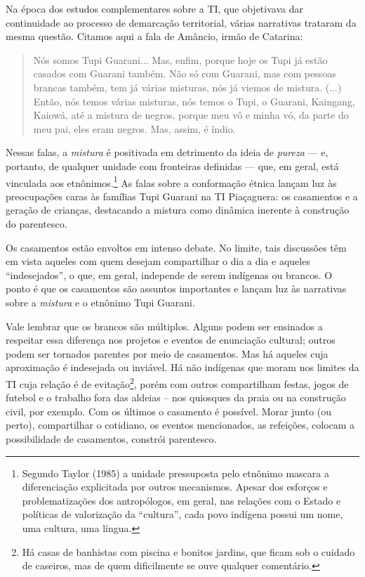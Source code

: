 Na época dos estudos complementares sobre a TI, que objetivava dar
continuidade ao processo de demarcação territorial, várias narrativas
trataram da mesma questão. Citamos aqui a fala de Amâncio, irmão de
Catarina:

\begin{quote}
Nós somos Tupi Guarani... Mas, enfim, porque hoje os Tupi já estão
casados com Guarani também. Não só com Guarani, mas com pessoas brancas
também, tem já várias misturas, nós já viemos de mistura. (...) Então,
nós temos várias misturas, nós temos o Tupi, o Guarani, Kaingang,
Kaiowá, até a mistura de negros, porque meu vô e minha vó, da parte do
meu pai, eles eram negros. Mas, assim, é índio.
\end{quote}

Nessas falas, a \emph{mistura} é positivada em detrimento da ideia de
\emph{pureza} --- e, portanto, de qualquer unidade com fronteiras
definidas --- que, em geral, está vinculada aos etnônimos.\footnote{Segundo
  Taylor (1985) a unidade pressuposta pelo etnônimo mascara a
  diferenciação explicitada por outros mecanismos. Apesar dos esforços e
  problematizações dos antropólogos, em geral, nas relações com o Estado
  e políticas de valorização da ``cultura'', cada povo indígena possui
  um nome, uma cultura, uma língua.} As falas sobre a conformação étnica
lançam luz às preocupações caras às famílias Tupi Guarani na TI
Piaçaguera: os casamentos e a geração de crianças, destacando a mistura
como dinâmica inerente à construção do parentesco.

Os casamentos estão envoltos em intenso debate. No limite, tais
discussões têm em vista aqueles com quem desejam compartilhar o dia a
dia e aqueles ``indesejados'', o que, em geral, independe de serem
indígenas ou brancos. O ponto é que os casamentos são assuntos
importantes e lançam luz às narrativas sobre a \emph{mistura} e o
etnônimo Tupi Guarani.

Vale lembrar que os brancos são múltiplos. Alguns podem ser ensinados a
respeitar essa diferença nos projetos e eventos de enunciação cultural;
outros podem ser tornados parentes por meio de casamentos. Mas há
aqueles cuja aproximação é indesejada ou inviável. Há não indígenas que
moram nos limites da TI cuja relação é de evitação\footnote{Há casas de
  banhistas com piscina e bonitos jardins, que ficam sob o cuidado de
  caseiros, mas de quem dificilmente se ouve qualquer comentário.},
porém com outros compartilham festas, jogos de futebol e o trabalho fora
das aldeias -- nos quiosques da praia ou na construção civil, por
exemplo. Com os últimos o casamento é possível. Morar junto (ou perto),
compartilhar o cotidiano, os eventos mencionados, as refeições, colocam
a possibilidade de casamentos, constrói parentesco.

